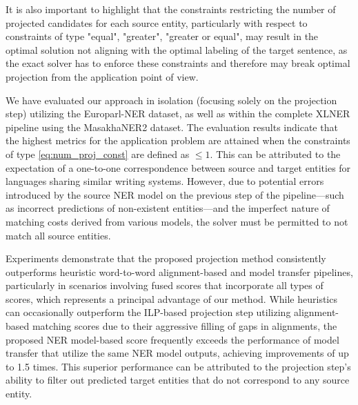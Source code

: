 It is also important to highlight that the constraints restricting the number of projected candidates
for each source entity, particularly with respect to constraints of type "equal", "greater", "greater or equal", may result
in the optimal solution not aligning with the optimal labeling of the target sentence, as the
exact solver has to enforce these constraints and therefore may break optimal projection from the application
point of view.

We have evaluated our approach in isolation (focusing solely on the projection step) utilizing the
Europarl-NER dataset, as well as within the complete XLNER pipeline using the MasakhaNER2 dataset.
The evaluation results indicate that the highest metrics for the application problem are attained when
the constraints of type \eqref{eq:num_proj_const} are defined as \( \leq 1 \). This can be attributed
to the expectation of a one-to-one correspondence between source and target entities for languages
sharing similar writing systems. However, due to potential errors introduced by the source NER
model on the previous step of the pipeline—such as incorrect predictions of non-existent entities—and
the imperfect nature of matching costs derived from various models, the solver must be permitted to
not match all source entities.

Experiments demonstrate that the proposed projection method consistently outperforms
heuristic word-to-word alignment-based and model transfer pipelines, particularly in scenarios
involving fused scores that incorporate all types of scores, which represents a principal advantage
of our method. While heuristics can occasionally outperform the ILP-based projection step utilizing
alignment-based matching scores due to their aggressive filling of gaps in alignments, the proposed
NER model-based score frequently exceeds the performance of model transfer that utilize the
same NER model outputs, achieving improvements of up to 1.5 times. This superior performance can be
attributed to the projection step's ability to filter out predicted target entities that do not
correspond to any source entity.

